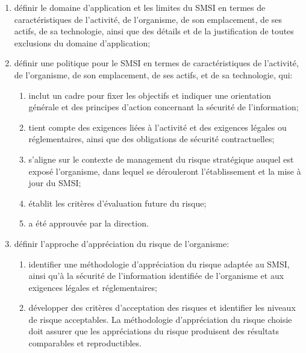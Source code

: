\begin{enumerate}
	\item définir le domaine d'application et les limites du SMSI en termes de caractéristiques de l'activité, de l'organisme, de son emplacement, de ses actifs, de sa technologie, ainsi que des détails et de la justification de toutes exclusions du domaine d'application;

	\item définir une politique pour le SMSI en termes de caractéristiques de l'activité, de l'organisme, de son emplacement, de ses actifs, et de sa technologie, qui:
	\begin{enumerate}
		\item inclut un cadre pour fixer les objectifs et indiquer une orientation générale et des principes d'action concernant la sécurité de l'information;
		\item tient compte des exigences liées à l'activité et des exigences légales ou réglementaires, ainsi que des obligations de sécurité contractuelles;
		\item s'aligne sur le contexte de management du risque stratégique auquel est exposé l'organisme, dans lequel se dérouleront l'établissement et la mise à jour du SMSI;
		\item établit les critères d'évaluation future du risque;
		\item a été approuvée par la direction.
	\end{enumerate}

	\item définir l'approche d'appréciation du risque de l'organisme:
	\begin{enumerate}
		\item identifier une méthodologie d'appréciation du risque adaptée au SMSI, ainsi qu'à la sécurité de l'information identifiée de l'organisme et aux exigences légales et réglementaires;
		\item développer des critères d'acceptation des risques et identifier les niveaux de risque acceptables. La méthodologie d'appréciation du risque choisie doit assurer que les appréciations du risque produisent des résultats comparables et reproductibles.
	\end{enumerate}


\end{enumerate}
